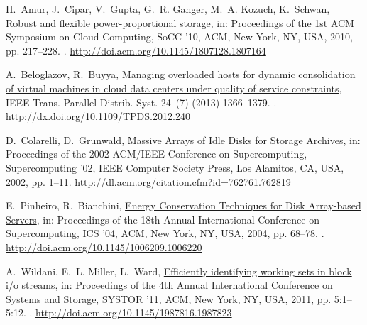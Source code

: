 \documentclass[preprint,12pt]{elsarticle}
\begin{document}
\begin{thebibliography}{10}
H.~Amur, J.~Cipar, V.~Gupta, G.~R. Ganger, M.~A. Kozuch, K.~Schwan,
  \href{http://doi.acm.org/10.1145/1807128.1807164}{Robust and flexible
  power-proportional storage}, in: Proceedings of the 1st ACM Symposium on
  Cloud Computing, SoCC '10, ACM, New York, NY, USA, 2010, pp. 217--228.
\newblock \href {http://dx.doi.org/10.1145/1807128.1807164}
  {}.
\newline\urlprefix\url{http://doi.acm.org/10.1145/1807128.1807164}

A.~Beloglazov, R.~Buyya,
  \href{http://dx.doi.org/10.1109/TPDS.2012.240}{Managing overloaded hosts for
  dynamic consolidation of virtual machines in cloud data centers under quality
  of service constraints}, IEEE Trans. Parallel Distrib. Syst. 24~(7) (2013)
  1366--1379.
\newblock \href {http://dx.doi.org/10.1109/TPDS.2012.240}
  {}.
\newline\urlprefix\url{http://dx.doi.org/10.1109/TPDS.2012.240}

D.~Colarelli, D.~Grunwald,
  \href{http://dl.acm.org/citation.cfm?id=762761.762819}{{Massive Arrays of
  Idle Disks for Storage Archives}}, in: Proceedings of the 2002 ACM/IEEE
  Conference on Supercomputing, Supercomputing '02, IEEE Computer Society
  Press, Los Alamitos, CA, USA, 2002, pp. 1--11.
\newline\urlprefix\url{http://dl.acm.org/citation.cfm?id=762761.762819}

E.~Pinheiro, R.~Bianchini,
  \href{http://doi.acm.org/10.1145/1006209.1006220}{{Energy Conservation
  Techniques for Disk Array-based Servers}}, in: Proceedings of the 18th Annual
  International Conference on Supercomputing, ICS '04, ACM, New York, NY, USA,
  2004, pp. 68--78.
\newblock \href {http://dx.doi.org/10.1145/1006209.1006220}
  {}.
\newline\urlprefix\url{http://doi.acm.org/10.1145/1006209.1006220}

A.~Wildani, E.~L. Miller, L.~Ward,
  \href{http://doi.acm.org/10.1145/1987816.1987823}{Efficiently identifying
  working sets in block i/o streams}, in: Proceedings of the 4th Annual
  International Conference on Systems and Storage, SYSTOR '11, ACM, New York,
  NY, USA, 2011, pp. 5:1--5:12.
\newblock \href {http://dx.doi.org/10.1145/1987816.1987823}
  {}.
\newline\urlprefix\url{http://doi.acm.org/10.1145/1987816.1987823}


\end{thebibliography}
\end{document}
